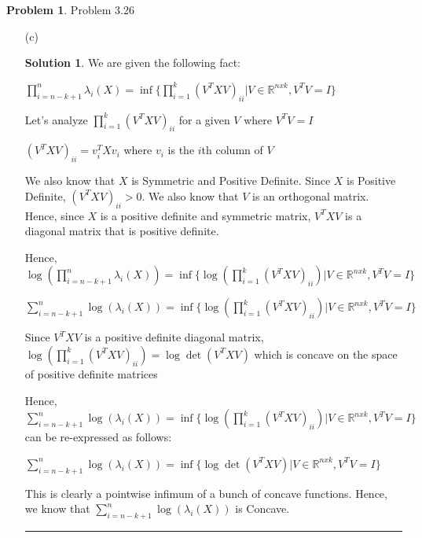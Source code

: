 \documentclass{article}
\theoremstyle{definition}
\newtheorem{problem}{Problem}
\def\fline{\rule{0.75\linewidth}{0.5pt}}
\newcommand{\finishline}{\begin{center}\fline\end{center}}
\newtheorem*{solution*}{Solution}
\newenvironment{solution}{\begin{solution*}}{{\finishline} \end{solution*}}
\begin{document}
\begin{problem} Problem 3.26
    \begin{itemize}
        \item[(c)] 
        \begin{solution}
            We are given the following fact: \newline 

            $\prod_{i=n - k + 1}^{n} \lambda_i(X) = \inf \{ \prod_{i=1}^{k} (V^T X V)_{ii} | V \in \mathbb{R}^{n x k}, V^TV = I \}$

            Let's analyze $\prod_{i=1}^{k} (V^T X V)_{ii}$ for a given $V$ where $V^TV = I$ \newline 

            $(V^T X V)_{ii} = v_i^T X v_i$ where $v_i$ is the $i$th column of $V$ \newline 

            We also know that $X$ is Symmetric and Positive Definite. Since $X$ is Positive Definite, $(V^T X V)_{ii} > 0$. We also know that $V$ is an orthogonal matrix. Hence, since $X$ is a positive definite and symmetric matrix, $V^TXV$ is a diagonal matrix that is positive definite. \newline 

            Hence, 
            $\log(\prod_{i=n - k + 1}^{n} \lambda_i(X)) = \inf \{ \log(\prod_{i=1}^{k} (V^T X V)_{ii}) | V \in \mathbb{R}^{n x k}, V^TV = I \}$ \newline 

            $\sum_{i=n - k + 1}^{n} \log(\lambda_i(X)) = \inf \{ \log(\prod_{i=1}^{k} (V^T X V)_{ii}) | V \in \mathbb{R}^{n x k}, V^TV = I \}$

            Since $V^TXV$ is a positive definite diagonal matrix, $\log(\prod_{i=1}^{k} (V^T X V)_{ii}) = \log \det(V^T X V)$ which is concave on the space of positive definite matrices 

            Hence, $\sum_{i=n - k + 1}^{n} \log(\lambda_i(X)) = \inf \{ \log(\prod_{i=1}^{k} (V^T X V)_{ii}) | V \in \mathbb{R}^{n x k}, V^TV = I \}$ can be re-expressed as follows: \newline 

            $\sum_{i=n - k + 1}^{n} \log(\lambda_i(X)) = \inf \{ \log \det (V^T X V) | V \in \mathbb{R}^{n x k}, V^TV = I \}$

            This is clearly a pointwise infimum of a bunch of concave functions. Hence, we know that $\sum_{i=n - k + 1}^{n} \log(\lambda_i(X))$ is Concave. 




            
        \end{solution}
    \end{itemize}
\end{problem}
\end{document}
